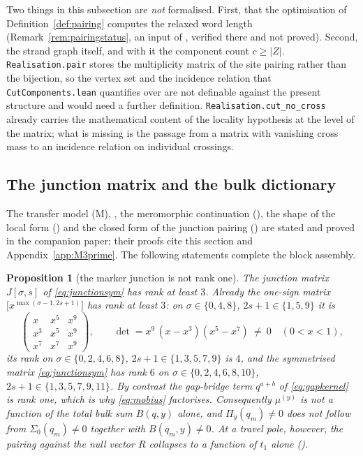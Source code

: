 \documentclass[11pt]{article}
\theoremstyle{plain}
\newtheorem{proposition}[theorem]{Proposition}
\theoremstyle{definition}
\theoremstyle{remark}
\begin{document}
Two things in this subsection are \emph{not} formalised. First, that the optimisation of
Definition~\ref{def:pairing} computes the relaxed word length (Remark~\ref{rem:pairingstatus}, an
input of \cite{Bonfioli2026a}, verified there and not proved). Second, the strand graph itself, and
with it the component count $c\ge|Z|$. \texttt{Realisation.pair} stores the multiplicity matrix of
the site pairing rather than the bijection, so the vertex set and the incidence relation that
\texttt{CutComponents.lean} quantifies over are not definable against the present structure and
would need a further definition. \texttt{Realisation.cut\_no\_cross} already carries the
mathematical content of the locality hypothesis at the level of the matrix; what is missing is the
passage from a matrix with vanishing cross mass to an incidence relation on individual crossings.


\subsection{The junction matrix and the bulk dictionary}\label{sec:junctiondict}

The transfer model \textup{(M)}, {\cite[Theorem ``the transfer model \textup{(M)}'', \textup{thm:model}]{Bonfioli2026bA}}, the meromorphic continuation
({\cite[Lemma ``meromorphic continuation'', \textup{lem:mero}]{Bonfioli2026bA}}), the shape of the local form ({\cite[Proposition ``the shape of the local form'', \textup{prop:shape}]{Bonfioli2026bA}}) and the closed
form of the junction pairing ({\cite[Theorem ``closed form of the junction pairing'', \textup{thm:RJ}]{Bonfioli2026bA}}) are stated and proved in the companion paper;
their proofs cite this section and Appendix~\ref{app:M3prime}. The following statements complete
the block assembly.

\begin{proposition}[the marker junction is not rank one]\label{prop:junction}
The junction matrix $J[\sigma,s]$ of \eqref{eq:junctionsym} has rank at least $3$. Already the
one-sign matrix $\bigl[x^{\max(\sigma-1,2s+1)}\bigr]$ has rank at least $3$: on
$\sigma\in\{0,4,8\}$, $2s+1\in\{1,5,9\}$ it is
\[
   \begin{pmatrix}x&x^5&x^9\\ x^3&x^5&x^9\\ x^7&x^7&x^9\end{pmatrix},\qquad
   \det=x^{9}\,(x-x^{3})(x^{5}-x^{7})\ \ne\ 0\quad(0<x<1),
\]
its rank on $\sigma\in\{0,2,4,6,8\}$, $2s+1\in\{1,3,5,7,9\}$ is $4$, and the symmetrised matrix
\eqref{eq:junctionsym} has rank $6$ on $\sigma\in\{0,2,4,6,8,10\}$, $2s+1\in\{1,3,5,7,9,11\}$. By
contrast the gap-bridge term $q^{a+b}$ of \eqref{eq:gapkernel} is rank one, which is why
\eqref{eq:mobius} factorises. Consequently $\mu^{(y)}$ is not a function of the total bulk sum
$B(q,y)$ alone, and $\Pi_y(q_m)\ne0$ does not follow from $\Sigma_0(q_m)\ne0$ together with
$B(q_m,y)\ne0$. At a travel pole, however, the pairing against the null vector $R$ collapses to a
function of $t_1$ alone ({\cite[Theorem ``closed form of the junction pairing'', \textup{thm:RJ}]{Bonfioli2026bA}}).
\end{proposition}
\end{document}
